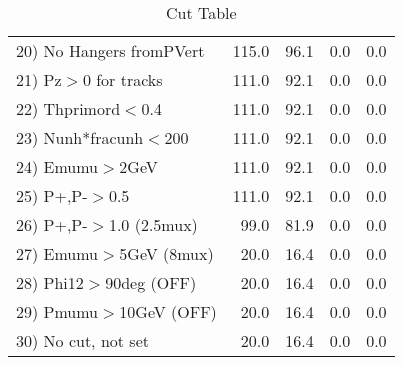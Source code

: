 \begin{table}[h!]
\begin{tabular}{||l||r|r|r|r||}
 20) No Hangers fromPVert &       115.0 &        96.1 &         0.0 &         0.0 \\
 21) Pz$>$0 for tracks    &       111.0 &        92.1 &         0.0 &         0.0 \\
 22) Thprimord$<$0.4      &       111.0 &        92.1 &         0.0 &         0.0 \\
 23) Nunh*fracunh$<$200   &       111.0 &        92.1 &         0.0 &         0.0 \\
 24) Emumu$>$2GeV         &       111.0 &        92.1 &         0.0 &         0.0 \\
 25) P+,P-$>$0.5          &       111.0 &        92.1 &         0.0 &         0.0 \\
 26) P+,P-$>$1.0 (2.5mux) &        99.0 &        81.9 &         0.0 &         0.0 \\
 27) Emumu$>$5GeV  (8mux) &        20.0 &        16.4 &         0.0 &         0.0 \\
 28) Phi12$>$90deg  (OFF) &        20.0 &        16.4 &         0.0 &         0.0 \\
 29) Pmumu$>$10GeV  (OFF) &        20.0 &        16.4 &         0.0 &         0.0 \\
 30) No cut, not set      &        20.0 &        16.4 &         0.0 &         0.0 \\
 \hline
 \hline
 \end{tabular}
 \caption{Cut Table \cohjp  }
 \label{tab-cut__jpsi}
 \end{table}
